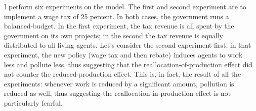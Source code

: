 \documentclass[letter, 12pt, epsf,leqno]{article}
\begin{document}


I perform six experiments on the model.  The first and second experiment are to implement a wage tax of 25 percent.  In both cases, the government runs a balanced-budget.  In the first experiment, the tax revenue is all spent by the government on its own projects; in the second the tax revenue is equally distributed to all living agents.  Let's consider the second experiment first: in that experiment, the new policy (wage tax and then rebate) induces agents to work less and pollute less, thus suggesting that the reallocation-of-production effect did not counter the reduced-production effect.  This is, in fact, the result of all the experiments: whenever work is reduced by a significant amount, pollution is reduced as well, thus suggesting the reallocation-in-production effect is not particularly fearful.  
\end{document}
